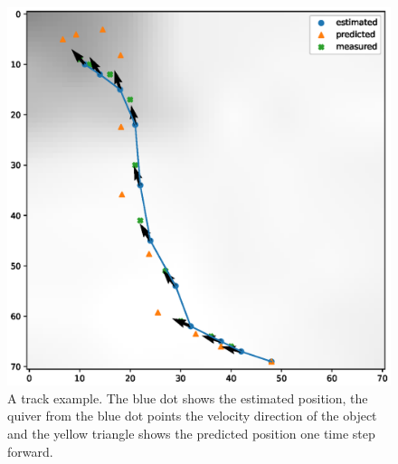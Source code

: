 \begin{figure}
  \centering
  \includegraphics[width=\textwidth]{figures/trackexample1.eps}
  \caption{A track example. The blue dot shows the estimated position, the quiver from the blue dot points the velocity direction of the object and the yellow triangle shows the predicted position one time step forward.}\label{fig:trackexample1}
\end{figure}
